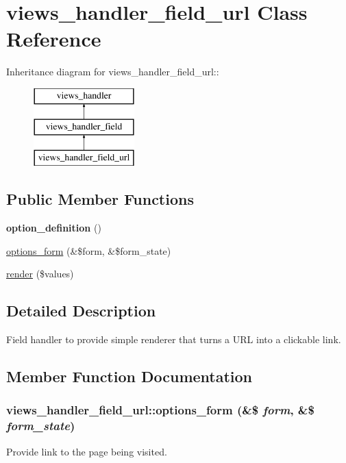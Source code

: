 \hypertarget{classviews__handler__field__url}{
\section{views\_\-handler\_\-field\_\-url Class Reference}
\label{classviews__handler__field__url}
}
Inheritance diagram for views\_\-handler\_\-field\_\-url::\begin{figure}[H]
\begin{center}
\leavevmode
\includegraphics[height=3cm]{classviews__handler__field__url}
\end{center}
\end{figure}
\subsection*{Public Member Functions}
\begin{DoxyCompactItemize}
\item 
\hypertarget{classviews__handler__field__url_a0b9b0b58eb2fbe175927c6e16d9142f9}{
{\bfseries option\_\-definition} ()}
\label{classviews__handler__field__url_a0b9b0b58eb2fbe175927c6e16d9142f9}

\item 
\hyperlink{classviews__handler__field__url_a47ffe90c19fe1a114df84f5779567cd3}{options\_\-form} (\&\$form, \&\$form\_\-state)
\item 
\hyperlink{classviews__handler__field__url_a6f96c8adfdd1892619793359448e70ad}{render} (\$values)
\end{DoxyCompactItemize}


\subsection{Detailed Description}
Field handler to provide simple renderer that turns a URL into a clickable link. 

\subsection{Member Function Documentation}
\hypertarget{classviews__handler__field__url_a47ffe90c19fe1a114df84f5779567cd3}{
\subsubsection[{options\_\-form}]{\setlength{\rightskip}{0pt plus 5cm}views\_\-handler\_\-field\_\-url::options\_\-form (\&\$ {\em form}, \/  \&\$ {\em form\_\-state})}}
\label{classviews__handler__field__url_a47ffe90c19fe1a114df84f5779567cd3}
Provide link to the page being visited. 

